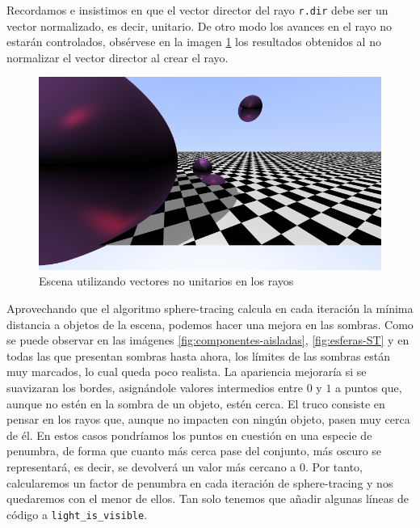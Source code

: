 Recordamos e insistimos en que el vector director del rayo \verb|r.dir| debe ser un vector normalizado, es decir, unitario. De otro modo los avances en el rayo no estarán controlados, obsérvese en la imagen \ref{fig:vectores-no-normalizados} los resultados obtenidos al no normalizar el vector director al crear el rayo.

\begin{figure} [ht]
    \centering
    \includegraphics[scale = 0.35]{img/C8/vectores-no-normalizados.png}
    \caption{Escena utilizando vectores no unitarios en los rayos}
    \label{fig:vectores-no-normalizados}
\end{figure}

Aprovechando que el algoritmo sphere-tracing calcula en cada iteración la mínima distancia a objetos de la escena, podemos hacer una mejora en las sombras. Como se puede observar en las imágenes \ref{fig:componentes-aisladas}, \ref{fig:esferas-ST} y en todas las que presentan sombras hasta ahora, los límites de las sombras están muy marcados, lo cual queda poco realista. La apariencia mejoraría si se suavizaran los bordes, asignándole valores intermedios entre $0$ y $1$ a puntos que, aunque no estén en la sombra de un objeto, estén cerca. El truco consiste en pensar en los rayos que, aunque no impacten con ningún objeto, pasen muy cerca de él. En estos casos pondríamos los puntos en cuestión en una especie de penumbra, de forma que cuanto más cerca pase del conjunto, más oscuro se representará, es decir, se devolverá un valor más cercano a $0$. Por tanto, calcularemos un factor de penumbra en cada iteración de sphere-tracing y nos quedaremos con el menor de ellos. Tan solo tenemos que añadir algunas líneas de código a \verb|light_is_visible|.

